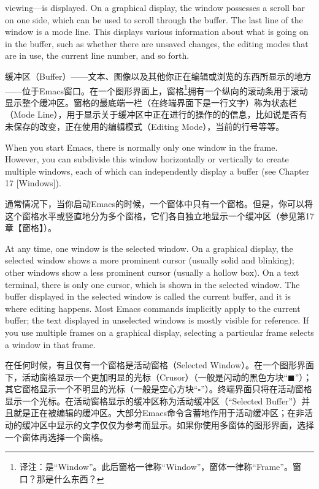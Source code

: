 viewing—is displayed. On a graphical display, the window possesses a scroll bar on one
side, which can be used to scroll through the buffer. The last line of the window is a mode
line. This displays various information about what is going on in the buffer, such as whether
there are unsaved changes, the editing modes that are in use, the current line number, and
so forth.
\par
缓冲区（Buffer）——文本、图像以及其他你正在编辑或浏览的东西所显示的地方——位于Emacs窗口。在一个图形界面上，窗格\footnote{译注：是“Window”。此后窗格一律称“Window”，窗体一律称“Frame”。窗口？那是什么东西？}拥有一个纵向的滚动条用于滚动显示整个缓冲区。窗格的最底端一栏（在终端界面下是一行文字）称为状态栏（Mode Line），用于显示关于缓冲区中正在进行的操作的的信息，比如说是否有未保存的改变，正在使用的编辑模式（Editing Mode），当前的行号等等。\par
When you start Emacs, there is normally only one window in the frame. However, you
can subdivide this window horizontally or vertically to create multiple windows, each of
which can independently display a buffer (see Chapter 17 [Windows]).
\par
通常情况下，当你启动Emacs的时候，一个窗体中只有一个窗格。但是，你可以将这个窗格水平或竖直地分为多个窗格，它们各自独立地显示一个缓冲区（参见第17章【窗格】）。\par
At any time, one window is the selected window. On a graphical display, the selected
window shows a more prominent cursor (usually solid and blinking); other windows show a
less prominent cursor (usually a hollow box). On a text terminal, there is only one cursor,
which is shown in the selected window. The buffer displayed in the selected window is
called the current buffer, and it is where editing happens. Most Emacs commands implicitly
apply to the current buffer; the text displayed in unselected windows is mostly visible for
reference. If you use multiple frames on a graphical display, selecting a particular frame
selects a window in that frame.\par
在任何时候，有且仅有一个窗格是活动窗格（Selected Window）。在一个图形界面下，活动窗格显示一个更加明显的光标（Crusor）（一般是闪动的黑色方块“$\blacksquare$”）；其它窗格显示一个不明显的光标（一般是空心方块“$\square$”）。终端界面只将在活动窗格显示一个光标。在活动窗格显示的缓冲区称为活动缓冲区（“Selected Buffer”）并且就是正在被编辑的缓冲区。大部分Emacs命令含蓄地作用于活动缓冲区；在非活动的缓冲区中显示的文字仅仅为参考而显示。如果你使用多窗体的图形界面，选择一个窗体再选择一个窗格。
